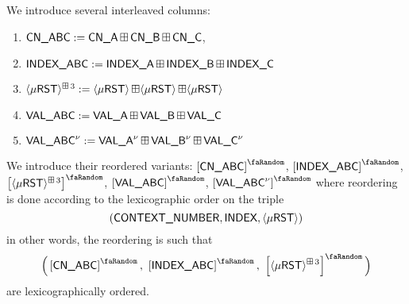We introduce several interleaved columns:
\begin{enumerate}
	\item $\cnABC := \cnA\cc\cnB\cc\cnC$,
	\item $\indexABC := \indexA\cc\indexB\cc\indexC$
	\item $\mst^{\cc3} := \mst\cc\mst\cc\mst$
	\item $\valABC := \valA\cc\valB\cc\valC$
	\item $\valABC\new := \valA\new\cc\valB\new\cc\valC\new$
\end{enumerate}
We introduce their reordered variants:
$\order{\cnABC}$, $\order{\indexABC}$, $\order{\mst^{\cc3}}$, $\order{\valABC}$, $\order{\valABC\new}$ where reordering is done according to the lexicographic order on the triple
\[
	(\CN{}, \index, \mst)
\]
in other words, the reordering is such that
\[
	\Big(
	\order{\cnABC},~
	\order{\indexABC},~
	\order{\mst^{\cc3}}
	\Big)
\]
are lexicographically ordered.